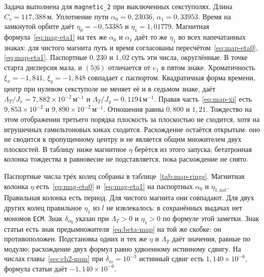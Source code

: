 Задача выполнена для \texttt{magnetic\_2} при выключенных секступолях. Длина $C_s=117{,}388\,\mathrm{м}$. Уплотнение пути $\alpha_0=0{,}23036$, $\alpha_1=0{,}33953$. Время на замкнутой орбите даёт $\eta_0=-0{,}53385$ и $\eta_1=1{,}01779$. Магнитная формула~\eqref{eq:mag-eta1} на тех же $\alpha_0$ и $\alpha_1$ даёт то же $\eta_1$ во всех напечатанных знаках: для чистого магнита путь и время согласованы пересчётом~\eqref{eq:map-eta0}, \eqref{eq:map-eta1}. Паспортные $0{,}230$ и $1{,}02$ суть эти числа, округлённые. В точке старта дисперсия мала, и $(5|6)$ отличается от $e_1$ в пятом знаке. Хроматичность $\xi_x=-1{,}841$, $\xi_y=-1{,}848$ совпадает с паспортом. Квадратичная форма времени, центр при нулевом секступоле не меняет её и в седьмом знаке, даёт $\Lambda_T/J_x=7{,}882\times 10^{-2}\,\mathrm{м}^{-1}$ и $\Lambda_T/J_y=0{,}1194\,\mathrm{м}^{-1}$. Правая часть~\eqref{eq:map-xi} есть $9{,}853\times 10^{-2}$ и $9{,}890\times 10^{-2}\,\mathrm{м}^{-1}$. Отношения равны $0{,}800$ и $1{,}21$. Тождество на этом отображении третьего порядка плоскость за плоскостью не сходится, хотя на игрушечных гамильтоновых киках сходится. Расхождение остаётся открытым: оно не сводится к пропущенному центру и не является общим множителем двух плоскостей. В таблицу ниже магнитное $\eta$ берётся из этого запуска; бетатронная колонка тождества в равновесие не подставляется, пока расхождение не снято.

Паспортные числа трёх колец собраны в таблице~\ref{tab:map-rings}. Магнитная колонка $\eta$ есть~\eqref{eq:mag-eta0} и~\eqref{eq:mag-eta1} на паспортных $\alpha_0$ и $\eta_{1,\mathrm{nat}}$. Правильная колонка есть период. Для чистого магнита они совпадают. Для двух других колец правильное $\eta_1$ из $l$ не извлекалось: в сохранённых выдачах нет мономов \texttt{ECM}. Знак $\delta_{\mathrm{eq}}$ указан при $\Lambda_T>0$ и $\eta_1>0$ по формуле этой заметки. Знак статьи есть знак предымножителя~\eqref{eq:beta-map} на той же скобке: он противоположен. Подстановка одних и тех же $\eta$ и $\Lambda_T$ даёт значения, равные по модулю; расхождение двух формул равно удвоенному истинному сдвигу. На числах главы~\ref{sec:ch2-num} при $\delta_m=10^{-3}$ истинный сдвиг есть $1{,}140\times 10^{-6}$, формула статьи даёт $-1{,}140\times 10^{-6}$.

